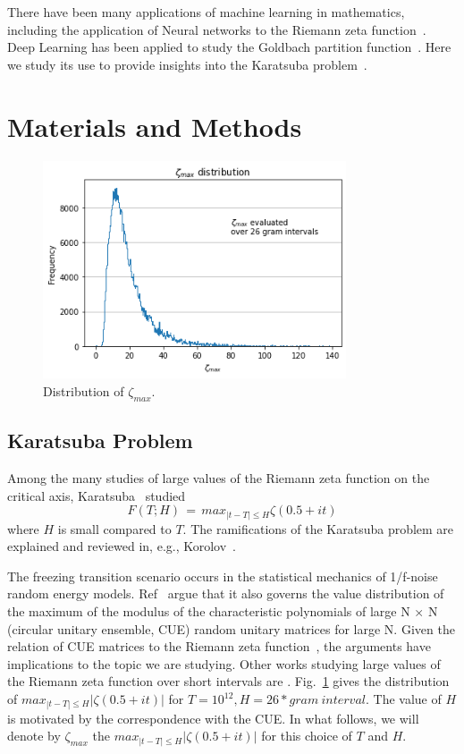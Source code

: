 \documentclass[twoside]{article}
\begin{document}
 There have been many applications of machine learning in mathematics, including 
the application of Neural networks to the Riemann zeta function~\cite{osneural}.
Deep Learning has been applied to study the Goldbach partition function~\cite{kim2022}.
Here we study its use to provide insights into  the Karatsuba problem~\cite{K5, Kor1}.


\section{\label{sec2}Materials and Methods}

\begin{figure}
\centering
\includegraphics[width=0.8\textwidth]{1.png}
\caption[]{ 
  Distribution of $\zeta_{max}$. 
  }
\vspace{1mm}
\label{z1}
\end{figure}

\subsection{\label{seckaratsuba}Karatsuba Problem}

Among the many studies of large values of the Riemann zeta function on the critical axis, Karatsuba~\cite{K5} studied 
\begin{equation}
F(T; H)  \, = \, max_{|t-T| \le H} \zeta ( 0.5+it ) 
\label{eqRie}
\end{equation}
where $H$ is small compared to $T$. The ramifications of the Karatsuba problem are explained and
reviewed in, e.g.,  Korolov~\cite{Kor1}.  

The freezing transition scenario occurs in the statistical mechanics of 1/f-noise random energy models. Ref~\cite{FK} argue that it  also governs the value distribution of the maximum of the modulus of the characteristic polynomials  of large N × N (circular unitary ensemble, CUE) random unitary  matrices for large N.  Given the relation of CUE matrices to the Riemann zeta function~\cite{oscue}, the arguments have implications to the topic we are studying. Other works studying large values of the Riemann zeta function over short intervals are \cite{Feng, Tihanyi, FTH, Ivic}. Fig.~\ref{z1} gives the distribution of $max_{|t-T| \le H}| \zeta ( 0.5+it ) |$ for $T=10^{12}, H=26*gram~interval$.  The value of $H$ is motivated by the correspondence with the CUE. In what follows, we will denote by $\zeta_{max}$ the  $max_{|t-T| \le H}| \zeta ( 0.5+it ) |$ for this choice of $T$ and $H$.
\end{document}
